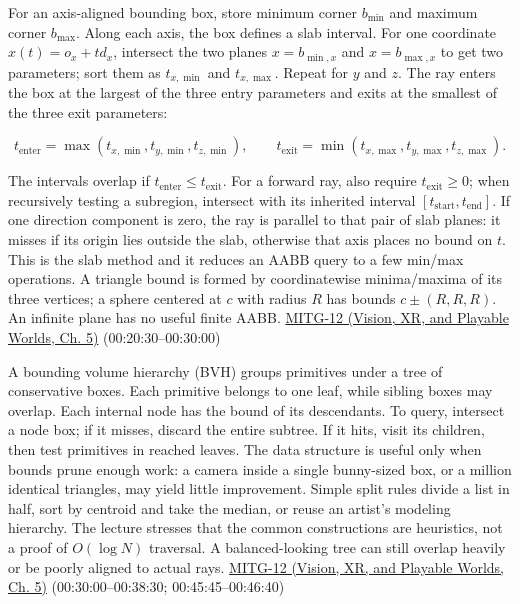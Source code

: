 For an axis-aligned bounding box, store minimum corner \(b_{\min}\) and maximum corner \(b_{\max}\). Along each axis, the box defines a slab interval. For one coordinate \(x(t)=o_x+td_x\), intersect the two planes \(x=b_{\min,x}\) and \(x=b_{\max,x}\) to get two parameters; sort them as \(t_{x,\min}\) and \(t_{x,\max}\). Repeat for \(y\) and \(z\). The ray enters the box at the largest of the three entry parameters and exits at the smallest of the three exit parameters:

\[
t_{\mathrm{enter}}=\max(t_{x,\min},t_{y,\min},t_{z,\min}),\qquad
t_{\mathrm{exit}}=\min(t_{x,\max},t_{y,\max},t_{z,\max}).
\]

The intervals overlap if \(t_{\mathrm{enter}}\leq t_{\mathrm{exit}}\). For a forward ray, also require \(t_{\mathrm{exit}}\geq0\); when recursively testing a subregion, intersect with its inherited interval \([t_{\mathrm{start}},t_{\mathrm{end}}]\). If one direction component is zero, the ray is parallel to that pair of slab planes: it misses if its origin lies outside the slab, otherwise that axis places no bound on \(t\). This is the slab method and it reduces an AABB query to a few min/max operations. A triangle bound is formed by coordinatewise minima/maxima of its three vertices; a sphere centered at \(c\) with radius \(R\) has bounds \(c\pm(R,R,R)\). An infinite plane has no useful finite AABB. \href{../07-Vision-XR-and-Playable-Worlds/main.pdf\#nameddest=04-visual-computing-ii-ch036-mitg-12---ray-tracing-ii}{MITG-12 (Vision, XR, and Playable Worlds, Ch. 5)} (00:20:30--00:30:00)

A bounding volume hierarchy (BVH) groups primitives under a tree of conservative boxes. Each primitive belongs to one leaf, while sibling boxes may overlap. Each internal node has the bound of its descendants. To query, intersect a node box; if it misses, discard the entire subtree. If it hits, visit its children, then test primitives in reached leaves. The data structure is useful only when bounds prune enough work: a camera inside a single bunny-sized box, or a million identical triangles, may yield little improvement. Simple split rules divide a list in half, sort by centroid and take the median, or reuse an artist's modeling hierarchy. The lecture stresses that the common constructions are heuristics, not a proof of \(O(\log N)\) traversal. A balanced-looking tree can still overlap heavily or be poorly aligned to actual rays. \href{../07-Vision-XR-and-Playable-Worlds/main.pdf\#nameddest=04-visual-computing-ii-ch036-mitg-12---ray-tracing-ii}{MITG-12 (Vision, XR, and Playable Worlds, Ch. 5)} (00:30:00--00:38:30; 00:45:45--00:46:40)

